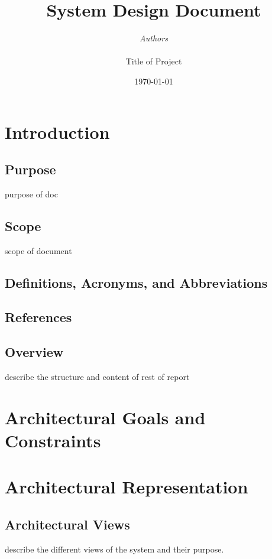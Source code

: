 \documentclass[11pt]{article}
\begin{document}

\thispagestyle{empty}
\title{{\LARGE\bf System Design Document}}
\author{{\Large\it Authors} \\
\vspace*{2.5in} 
\mbox{} \\
{\Large Title of Project}
\vspace*{2.5in} 
\mbox{} \\
\date{\today}
}
\maketitle

\tableofcontents

%

\section{Introduction}
\subsection{Purpose}
purpose of doc 
\subsection{Scope}
scope of document
\subsection{Definitions, Acronyms, and Abbreviations}

\subsection{References}
\subsection{Overview}
describe the structure and content of rest of report
\section{Architectural Goals and Constraints}


\section{Architectural Representation}
\subsection{Architectural Views}
describe the different views of the system and their purpose.
\end{document}
